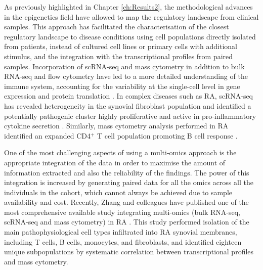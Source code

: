 As previously highlighted in Chapter \ref{ch:Results2}, the methodological advances in the epigenetics field have allowed to map the regulatory landscape from clinical samples. This approach has facilitated the characterisation of the closest regulatory landscape to disease conditions using cell populations directly isolated from patients, instead of cultured cell lines or primary cells with additional stimulus, and the integration with the transcriptional profiles from paired samples. Incorporation of scRNA-seq and mass cytometry in addition to bulk RNA-seq and flow cytometry have led to a more detailed understanding of the immune system, accounting for the variability at the single-cell level in gene expression and protein translation \parencite{Jaitin2014, Villani2017,Bengsch2018}. In complex diseases such as RA, scRNA-seq has revealed heterogeneity in the synovial fibroblast population and identified a potentially pathogenic cluster highly proliferative and active in pro-inflammatory cytokine secretion \parencite{Mizoguchi2018}. Similarly, mass cytometry analysis performed in RA identified an expanded CD4$^+$ T cell population promoting B cell response \parencite{Rao2017}.





One of the most challenging aspects of using a multi-omics approach is the appropriate integration of the data in order to maximise the amount of information extracted and also the reliability of the findings. The power of this integration is increased by generating paired data for all the omics across all the individuals in the cohort, which cannot always be achieved due to sample availability and cost. Recently, Zhang and colleagues have published one of the most comprehensive available study integrating multi-omics (bulk RNA-seq, scRNA-seq and mass cytometry) in RA \parencite{Zhang2018}. This study performed isolation of the main pathophysiological cell types infiltrated into RA synovial membranes, including T cells, B cells, monocytes, and fibroblasts, and identified eighteen unique subpopulations by systematic correlation between transcriptional profiles and mass cytometry.



